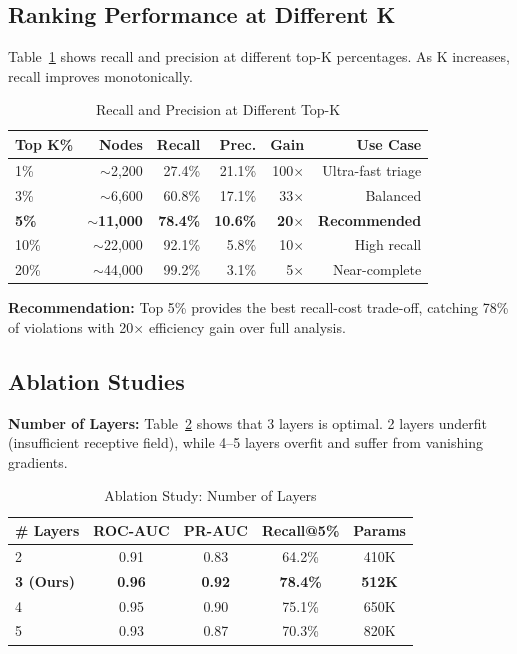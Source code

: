 \subsection{Ranking Performance at Different K}

Table~\ref{tab:recall_k} shows recall and precision at different top-K percentages. As K increases, recall improves monotonically.

\begin{table}[t]
\centering
\caption{Recall and Precision at Different Top-K}
\label{tab:recall_k}
\begin{tabular}{@{}lrrrrr@{}}
\toprule
\textbf{Top K\%} & \textbf{Nodes} & \textbf{Recall} & \textbf{Prec.} & \textbf{Gain} & \textbf{Use Case} \\
\midrule
1\% & $\sim$2,200 & 27.4\% & 21.1\% & 100$\times$ & Ultra-fast triage \\
3\% & $\sim$6,600 & 60.8\% & 17.1\% & 33$\times$ & Balanced \\
\textbf{5\%} & \textbf{$\sim$11,000} & \textbf{78.4\%} & \textbf{10.6\%} & \textbf{20$\times$} & \textbf{Recommended} \\
10\% & $\sim$22,000 & 92.1\% & 5.8\% & 10$\times$ & High recall \\
20\% & $\sim$44,000 & 99.2\% & 3.1\% & 5$\times$ & Near-complete \\
\bottomrule
\end{tabular}
\end{table}

\textbf{Recommendation:} Top 5\% provides the best recall-cost trade-off, catching 78\% of violations with 20$\times$ efficiency gain over full analysis.

\subsection{Ablation Studies}

\textbf{Number of Layers:} Table~\ref{tab:ablation_layers} shows that 3 layers is optimal. 2 layers underfit (insufficient receptive field), while 4--5 layers overfit and suffer from vanishing gradients.

\begin{table}[t]
\centering
\caption{Ablation Study: Number of Layers}
\label{tab:ablation_layers}
\begin{tabular}{@{}lcccc@{}}
\toprule
\textbf{\# Layers} & \textbf{ROC-AUC} & \textbf{PR-AUC} & \textbf{Recall@5\%} & \textbf{Params} \\
\midrule
2 & 0.91 & 0.83 & 64.2\% & 410K \\
\textbf{3 (Ours)} & \textbf{0.96} & \textbf{0.92} & \textbf{78.4\%} & \textbf{512K} \\
4 & 0.95 & 0.90 & 75.1\% & 650K \\
5 & 0.93 & 0.87 & 70.3\% & 820K \\
\bottomrule
\end{tabular}
\end{table}

